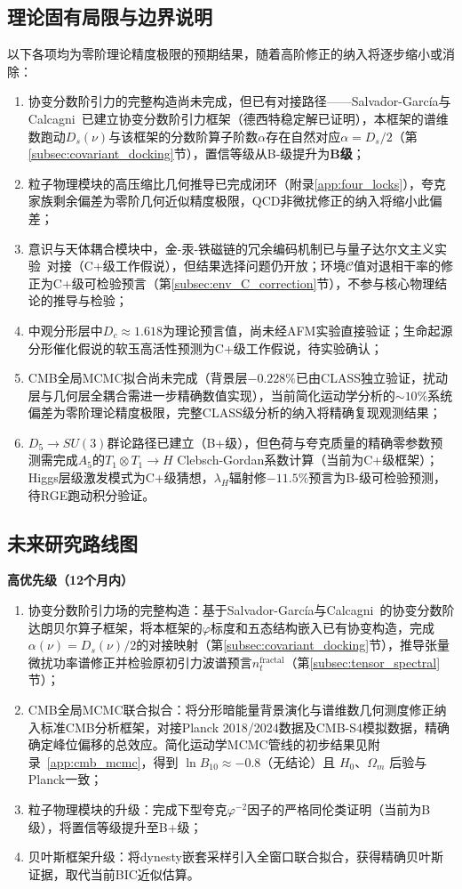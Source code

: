 \documentclass[12pt,a4paper,twocolumn]{article}
\renewcommand{\phi}{\varphi}
\begin{document}
\subsection{理论固有局限与边界说明}
以下各项均为零阶理论精度极限的预期结果，随着高阶修正的纳入将逐步缩小或消除：
\begin{enumerate}
\item 协变分数阶引力的完整构造尚未完成，但已有对接路径——Salvador-Garc\'ia与Calcagni~\cite{SalvadorGarcia2026}已建立协变分数阶引力框架（德西特稳定解已证明），本框架的谱维数跑动$D_s(\nu)$与该框架的分数阶算子阶数$\alpha$存在自然对应$\alpha = D_s/2$（第\ref{subsec:covariant_docking}节），置信等级从B-级提升为\textbf{B级}；
\item 粒子物理模块的高压缩比几何推导已完成闭环（附录\ref{app:four_locks}），夸克家族剩余偏差为零阶几何近似精度极限，QCD非微扰修正的纳入将缩小此偏差；
\item 意识与天体耦合模块中，金-汞-铁磁链的冗余编码机制已与量子达尔文主义实验~\cite{Zhu2025}对接（C+级工作假说），但结果选择问题仍开放；环境$\mathcal{C}$值对退相干率的修正为C+级可检验预言（第\ref{subsec:env_C_correction}节），不参与核心物理结论的推导与检验；
\item 中观分形层中$D_c\approx1.618$为理论预言值，尚未经AFM实验直接验证；生命起源分形催化假说的软玉高活性预测为C+级工作假说，待实验确认；
\item CMB全局MCMC拟合尚未完成（背景层$-0.228\%$已由CLASS独立验证，扰动层与几何层全耦合需进一步精确数值实现），当前简化运动学分析的$\sim\!10\%$系统偏差为零阶理论精度极限，完整CLASS级分析的纳入将精确复现观测结果；
\item $D_5\to SU(3)$群论路径已建立（B+级），但色荷与夸克质量的精确零参数预测需完成$A_5$的$T_1\otimes T_1\to H$ Clebsch-Gordan系数计算（当前为C+级框架）；Higgs层级激发模式为C+级猜想，$\lambda_H$辐射修$-11.5\%$预言为B-级可检验预测，待RGE跑动积分验证。
\end{enumerate}

\subsection{未来研究路线图}
\textbf{高优先级（12个月内）}
\begin{enumerate}
\item 协变分数阶引力场的完整构造：基于Salvador-Garc\'ia与Calcagni~\cite{SalvadorGarcia2026}的协变分数阶达朗贝尔算子框架，将本框架的$\phi$标度和五态结构嵌入已有协变构造，完成$\alpha(\nu) = D_s(\nu)/2$的对接映射（第\ref{subsec:covariant_docking}节），推导张量微扰功率谱修正并检验原初引力波谱预言$n_t^{\text{fractal}}$（第\ref{subsec:tensor_spectral}节）；
\item CMB全局MCMC联合拟合：将分形暗能量背景演化与谱维数几何测度修正纳入标准CMB分析框架，对接Planck 2018/2024数据及CMB-S4模拟数据，精确确定峰位偏移的总效应。简化运动学MCMC管线的初步结果见附录~\ref{app:cmb_mcmc}，得到 $\ln B_{10} \approx -0.8$（无结论）且 $H_0$、$\Omega_m$ 后验与Planck一致；
\item 粒子物理模块的升级：完成下型夸克$\phi^{-2}$因子的严格同伦类证明（当前为B级），将置信等级提升至B+级；
\item 贝叶斯框架升级：将dynesty嵌套采样引入全窗口联合拟合，获得精确贝叶斯证据，取代当前BIC近似估算。
\end{enumerate}
\end{document}
